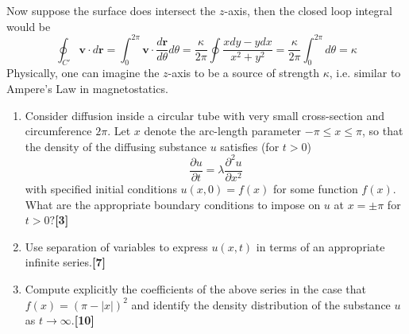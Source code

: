 \documentclass[a4paper]{article}
\begin{document}
\begin{ans}
\begin{enumerate}[label=(\alph*)]
\begin{enumerate}[label=(\roman*)]
\begin{center}
  \end{center}
Now suppose the surface does intersect the $z$-axis, then the closed loop integral would be
$$\oint_{C'}\mathbf{v}\cdot d\mathbf{r}=\int_0^{2\pi}\mathbf{v}\cdot\frac{d\mathbf{r}}{d\theta} d\theta=\frac{\kappa}{2\pi}\oint\frac{xdy-ydx}{x^2+y^2}=\frac{\kappa}{2\pi}\int_0^{2\pi} d\theta=\kappa$$
Physically, one can imagine the $z$-axis to be a source of strength $\kappa$, i.e. similar to Ampere's Law in magnetostatics.
\end{enumerate}
\end{enumerate}
\end{ans}
\newpage
\begin{qns}\leavevmode
\begin{enumerate}[label=(\alph*)]
    \item Consider diffusion inside a circular tube with very small cross-section and circumference $2\pi$. Let $x$ denote the arc-length parameter $-\pi\leq x\leq\pi$, so that the density of the diffusing substance $u$ satisfies (for $t>0$)
$$\frac{\partial u}{\partial t}=\lambda\frac{\partial^2u}{\partial x^2}$$
with specified initial conditions $u(x,0)=f(x)$ for some function $f(x)$. What are the appropriate boundary conditions to impose on $u$ at $x=\pm\pi$ for $t>0?$\hfill \textbf{[3]}
\item Use separation of variables to express $u(x,t)$ in terms of an appropriate infinite series.\hfill \textbf{[7]}
\item Compute explicitly the coefficients of the above series in the case that $f(x)=(\pi-|x|)^2$ and identify the density distribution of the substance $u$ as $t\rightarrow\infty$.\hfill \textbf{[10]}
\end{enumerate}
\end{qns}
\end{document}
